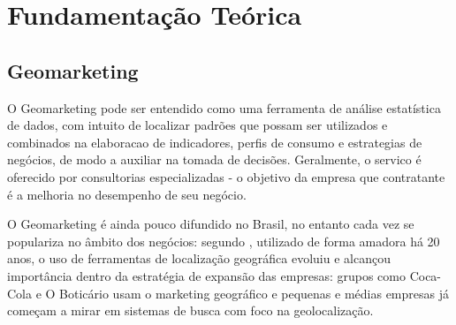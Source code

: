 
\chapter{Fundamentação Teórica}
\label{fundamentacao-teorica}

\section {Geomarketing}
O Geomarketing pode ser entendido como uma ferramenta de análise estatística de dados, com intuito de localizar padrões que possam ser utilizados e combinados na elaboracao de indicadores, perfis de consumo e estrategias de negócios, de modo a auxiliar na tomada de decisões. Geralmente, o servico é oferecido por consultorias especializadas - o  objetivo da empresa que contratante é a melhoria no desempenho de seu negócio.

O Geomarketing é ainda pouco difundido no Brasil, no entanto cada vez se populariza no âmbito dos negócios: segundo \cite{Exame}, utilizado de forma amadora há 20 anos, o uso de ferramentas de localização geográfica evoluiu e alcançou importância dentro da estratégia de expansão das empresas: grupos como Coca-Cola e O Boticário usam o marketing geográfico e pequenas e médias empresas já começam a mirar em sistemas de busca com foco na geolocalização. 
